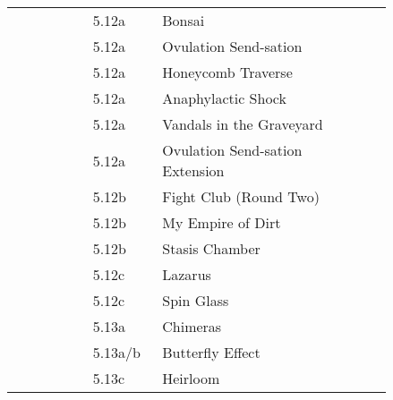 \begin{flushleft}
\begin{center}
\begin{supertabular}{p{0.18\linewidth}p{0.13\linewidth}p{0.45\linewidth}p{0.08\linewidth}}
&5.12a&Bonsai & \pageref{rt:Bonsai} \\
&5.12a&Ovulation Send-sation & \pageref{rt:Ovulation Send-sation} \\
&5.12a&Honeycomb Traverse & \pageref{vr:Honeycomb Traverse} \\
&5.12a&Anaphylactic Shock & \pageref{rt:Anaphylactic Shock} \\
&5.12a&Vandals in the Graveyard & \pageref{rt:Vandals in the Graveyard} \\
&5.12a&Ovulation Send-sation Extension & \pageref{vr:Ovulation Send-sation Extension} \\
&5.12b&Fight Club (Round Two) & \pageref{rt:Fight Club (Round Two)} \\
&5.12b&My Empire of Dirt & \pageref{rt:My Empire of Dirt} \\
&5.12b&Stasis Chamber & \pageref{rt:Stasis Chamber} \\
&5.12c&Lazarus & \pageref{vr:Lazarus} \\
&5.12c&Spin Glass & \pageref{rt:Spin Glass} \\
&5.13a&Chimeras & \pageref{rt:Chimeras} \\
&5.13a/b&Butterfly Effect & \pageref{rt:Butterfly Effect} \\
&5.13c&Heirloom & \pageref{rt:Heirloom} \\
\end{supertabular}
\end{center}

\end{flushleft}
